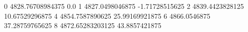 0 4828.76708984375 0.0
1 4827.0498046875 -1.71728515625
2 4839.4423828125 10.67529296875
4 4854.7587890625 25.99169921875
6 4866.0546875 37.28759765625
8 4872.65283203125 43.8857421875
